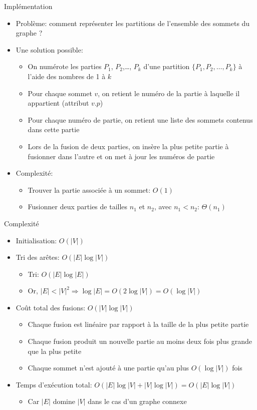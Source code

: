 \begin{frame}{Implémentation}
\begin{itemize}
\item Problème: comment représenter les partitions de l'ensemble des sommets du graphe ?
\item Une solution possible:
\begin{itemize}
\item On numérote les parties $P_1$, $P_2$,\ldots, $P_k$ d'une partition $\{P_1,P_2,\ldots, P_k\}$ à l'aide des nombres de 1 à $k$
\item Pour chaque sommet $v$, on retient le numéro de la partie à
  laquelle il appartient (attribut $v.p$)
\item Pour chaque numéro de partie, on retient une liste des sommets contenus dans cette partie
\item Lors de la fusion de deux parties, on insère la plus petite
  partie à fusionner dans l'autre et on met à jour les numéros de partie
\end{itemize}
\item Complexité:
\begin{itemize}
\item Trouver la partie associée à un sommet: $O(1)$
\item Fusionner deux parties de tailles $n_1$ et $n_2$, avec $n_1<n_2$: $\Theta(n_1)$
\end{itemize}
\end{itemize}

\end{frame}

\begin{frame}{Complexité}
\begin{itemize}
\item Initialisation: $O(|V|)$
\item Tri des arêtes: $O(|E|\log |V|)$
\begin{itemize}
\item Tri: $O(|E|\log |E|)$
\item Or, $|E|<|V|^2 \Rightarrow \log |E|=O(2\log|V|)=O(\log |V|)$
\end{itemize}
\item Coût total des fusions: $O(|V|\log |V|)$
\begin{itemize}
\item Chaque fusion est linéaire par rapport à la taille de la plus
  petite partie
\item Chaque fusion produit un nouvelle partie au moins deux fois plus
  grande que la plus petite
\item Chaque sommet n'est ajouté à une partie qu'au plus $O(\log|V|)$ fois
\end{itemize}
\item Temps d'exécution total: $O(|E|\log |V|+|V|\log|V|) = O(|E|\log |V|)$
\begin{itemize}
\item Car $|E|$ domine $|V|$ dans le cas d'un graphe connexe
\end{itemize}
\end{itemize}

\end{frame}

